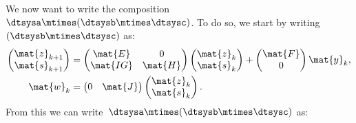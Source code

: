 We now want to write the composition~$\dtsysa\mtimes (\dtsysb\mtimes \dtsysc)$.
To do so, we start by writing~$(\dtsysb\mtimes \dtsysc)$ as:
\begin{equation*}
    \label{eq:dlin-6}
    \begin{aligned}
        \begin{pmatrix}
            \mat{z}_{k+1} \\
            \mat{s}_{k+1}
        \end{pmatrix} & =
        \begin{pmatrix}
            \mat{E}  & 0       \\
            \mat{IG} & \mat{H}
        \end{pmatrix}\begin{pmatrix}
                         \mat{z}_k \\ \mat{s}_k
                     \end{pmatrix}+
        \begin{pmatrix}
            \mat{F} \\ 0
        \end{pmatrix}\mat{y}_k,                                \\
        \mat{w}_k        & =\begin{pmatrix}
                                0 & \mat{J}
                            \end{pmatrix}\begin{pmatrix}
                                             \mat{z}_k \\ \mat{s}_k
                                         \end{pmatrix}.
    \end{aligned}
\end{equation*}
From this we can write~$\dtsysa\mtimes (\dtsysb\mtimes \dtsysc)$ as:
